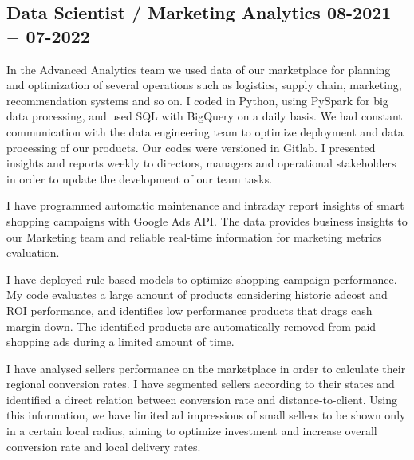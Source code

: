\subsection{{Data Scientist / Marketing Analytics \hfill 08-2021 $-$ 07-2022}}
\begin{zitemize}
\item  In the Advanced Analytics team we used data of our marketplace for planning and optimization of several operations such
as logistics, supply chain, marketing, recommendation systems and so on. I coded in Python, using PySpark for big data processing, and used SQL with BigQuery on a daily basis. We had constant communication with the data engineering team to optimize deployment and data processing of our products. Our codes were versioned in Gitlab. I presented insights and reports weekly to directors, managers and operational stakeholders in order to update the development of our team tasks.
\item I have programmed automatic maintenance and intraday report insights of smart shopping campaigns with Google Ads API. The data provides business insights to our Marketing team and reliable real-time information for marketing metrics evaluation.
\item I have deployed rule-based models to optimize shopping campaign performance. My code evaluates a large amount of products considering historic adcost and ROI performance, and identifies low performance products that drags cash margin down. The identified products are automatically removed from paid shopping ads during a limited amount of time.
\item I have analysed sellers performance on the marketplace in order to calculate their regional conversion rates. I have segmented sellers according to their states and identified a direct relation between conversion rate and distance-to-client. Using this information, we have limited ad impressions of small sellers to be shown only in a certain local radius, aiming to optimize investment and increase overall conversion rate and local delivery rates.
\end{zitemize}
